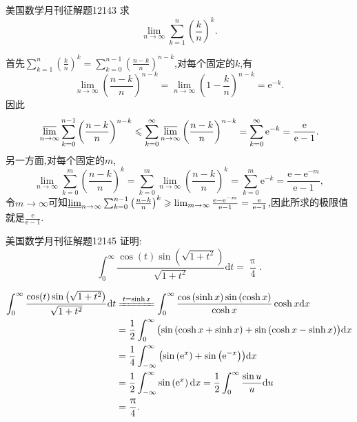 \documentclass[UTF8,no-math,12pt,openany,table,dvipsnames,svgnames]{book}
\newcommand{\ee}{\mathrm e}
\renewcommand{\pi}{\uppi}
\newcommand{\hei}{\CJKfamily{hei}}
\newenvironment{Proof}{\par\indent{\hei 证明}\hspace{1em}}{\par}
\newenvironment{solve}{\par\indent{\hei 解}\hspace{1em}}{\par}
\begin{document}
\begin{MYBOX}[colbacktitle=blue]{美国数学月刊征解题12143}
求
\[\lim_{n\to\infty}\sum_{k=1}^n\left(\frac kn\right)^k.\]
\begin{solve}
首先$\sum_{k=1}^n\left(\frac kn\right)^k=\sum_{k=0}^{n-1}\left(\frac{n-k}n\right)^{n-k}$,对每个固定的$k$,有
\[\lim_{n\to\infty}\left(\frac{n-k}n\right)^{n-k}
=\lim_{n\to\infty}\left(1-\frac kn\right)^{n-k}=\ee^{-k}.\]
因此
\[
\varlimsup_{n\rightarrow \infty}\sum_{k=0}^{n-1}{\left( \frac{n-k}{n} \right) ^{n-k}}\leqslant \sum_{k=0}^{\infty}\varlimsup_{n\rightarrow \infty}\left( \frac{n-k}{n} \right) ^{n-k}=\sum_{k=0}^{\infty}{\text{e}^{-k}}=\frac{\text{e}}{\text{e}-1}.
\]
另一方面,对每个固定的$m$,
\[
\lim_{n\rightarrow \infty} \sum_{k=0}^m{\left( \frac{n-k}{n} \right) ^k}=\sum_{k=0}^m{\lim_{n\rightarrow \infty}}\left( \frac{n-k}{n} \right) ^k=\sum_{k=0}^m{\text{e}^{-k}}=\frac{\text{e}-\text{e}^{-m}}{\text{e}-1},
\]
令$m\to\infty$可知$\varliminf_{n\to\infty}\sum_{k=0}^{n-1}{\left( \frac{n-k}{n} \right) ^k}\geqslant \lim_{m\rightarrow \infty} \frac{\text{e}-\text{e}^{-m}}{\text{e}-1}=\frac{\text{e}}{\text{e}-1}$,因此所求的极限值就是$\frac{\ee}{\ee-1}$.
\end{solve}
\end{MYBOX}

\begin{MYBOX}[colbacktitle=red]{美国数学月刊征解题12145}
证明:
\[\int_0^{\infty}\frac{\cos (t)\sin\left(\sqrt{1+t^2}\right)}{\sqrt{1+t^2}}\mathrm dt=\frac\pi4.\]
\begin{Proof}
\begin{align*}
\int_0^{\infty}\frac{\cos (t)\sin\left(\sqrt{1+t^2}\right)}{\sqrt{1+t^2}}\mathrm dt
&\xlongequal{t=\sinh x}\int_0^{\infty}{\frac{\cos \left( \sinh x \right) \sin \left( \cosh x \right)}{\cosh x}\cosh x\text{d}x}\\
&=\frac{1}{2}\int_0^{\infty}{\bigl( \sin \left( \cosh x+\sinh x \right) +\sin \left( \cosh x-\sinh x \right) \bigr) \text{d}x}\\
&=\frac{1}{4}\int_{-\infty}^{\infty}{\bigl( \sin \left( \text{e}^x \right) +\sin \left( \text{e}^{-x} \right) \bigr) \text{d}x}\\
&=\frac{1}{2}\int_{-\infty}^{\infty}{\sin \left( \text{e}^x \right) \text{d}x}=\frac{1}{2}\int_0^{\infty}{\frac{\sin u}{u}\text{d}u}\\
&=\frac{\pi}{4}.
\end{align*}
\end{Proof}
\end{MYBOX}
\end{document}
